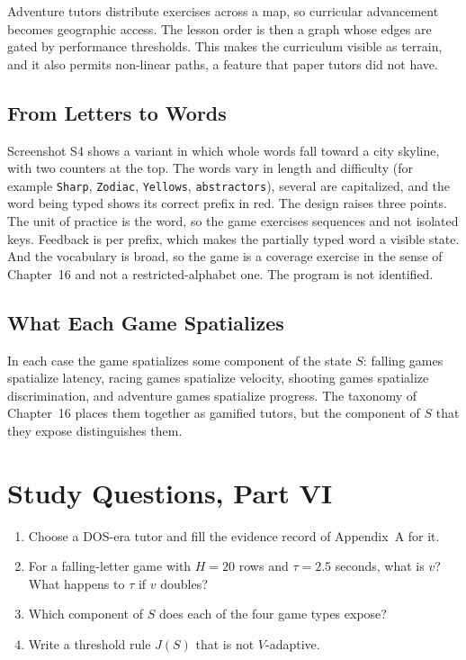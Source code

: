 Adventure tutors distribute exercises across a map, so curricular advancement becomes geographic access. The lesson order is then a graph whose edges are gated by performance thresholds. This makes the curriculum visible as terrain, and it also permits non-linear paths, a feature that paper tutors did not have.

\section{From Letters to Words}

Screenshot S4 shows a variant in which whole words fall toward a city skyline, with two counters at the top. The words vary in length and difficulty (for example \texttt{Sharp}, \texttt{Zodiac}, \texttt{Yellows}, \texttt{abstractors}), several are capitalized, and the word being typed shows its correct prefix in red. The design raises three points. The unit of practice is the word, so the game exercises sequences and not isolated keys. Feedback is per prefix, which makes the partially typed word a visible state. And the vocabulary is broad, so the game is a coverage exercise in the sense of Chapter~16 and not a restricted-alphabet one. The program is not identified. 

\section{What Each Game Spatializes}

In each case the game spatializes some component of the state $S$: falling games spatialize latency, racing games spatialize velocity, shooting games spatialize discrimination, and adventure games spatialize progress. The taxonomy of Chapter~16 places them together as gamified tutors, but the component of $S$ that they expose distinguishes them. 

\chapter*{Study Questions, Part VI}
\begin{enumerate}
\item Choose a DOS-era tutor and fill the evidence record of Appendix~A for it.
\item For a falling-letter game with $H=20$ rows and $\tau=2.5$ seconds, what is $v$? What happens to $\tau$ if $v$ doubles?
\item Which component of $S$ does each of the four game types expose?
\item Write a threshold rule $J(S)$ that is not $V$-adaptive.
\end{enumerate}
